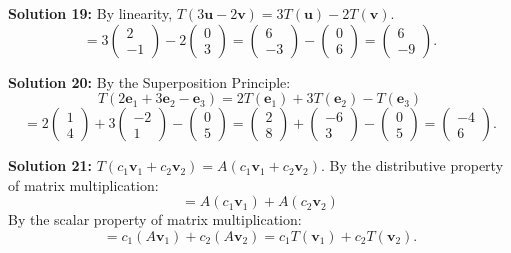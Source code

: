 \documentclass{article}
\begin{document}
\textbf{Solution 19:}
By linearity, $T(3\mathbf{u} - 2\mathbf{v}) = 3T(\mathbf{u}) - 2T(\mathbf{v})$.
$$= 3\begin{pmatrix} 2 \\ -1 \end{pmatrix} - 2\begin{pmatrix} 0 \\ 3 \end{pmatrix} = \begin{pmatrix} 6 \\ -3 \end{pmatrix} - \begin{pmatrix} 0 \\ 6 \end{pmatrix} = \begin{pmatrix} 6 \\ -9 \end{pmatrix}.$$

\textbf{Solution 20:}
By the Superposition Principle:
$$T(2\mathbf{e}_1 + 3\mathbf{e}_2 - \mathbf{e}_3) = 2T(\mathbf{e}_1) + 3T(\mathbf{e}_2) - T(\mathbf{e}_3)$$
$$= 2\begin{pmatrix} 1 \\ 4 \end{pmatrix} + 3\begin{pmatrix} -2 \\ 1 \end{pmatrix} - \begin{pmatrix} 0 \\ 5 \end{pmatrix} = \begin{pmatrix} 2 \\ 8 \end{pmatrix} + \begin{pmatrix} -6 \\ 3 \end{pmatrix} - \begin{pmatrix} 0 \\ 5 \end{pmatrix} = \begin{pmatrix} -4 \\ 6 \end{pmatrix}.$$

\textbf{Solution 21:}
$T(c_1\mathbf{v}_1 + c_2\mathbf{v}_2) = A(c_1\mathbf{v}_1 + c_2\mathbf{v}_2)$. By the distributive property of matrix multiplication: 
$$= A(c_1\mathbf{v}_1) + A(c_2\mathbf{v}_2)$$
By the scalar property of matrix multiplication:
$$= c_1(A\mathbf{v}_1) + c_2(A\mathbf{v}_2) = c_1T(\mathbf{v}_1) + c_2T(\mathbf{v}_2).$$
\end{document}
